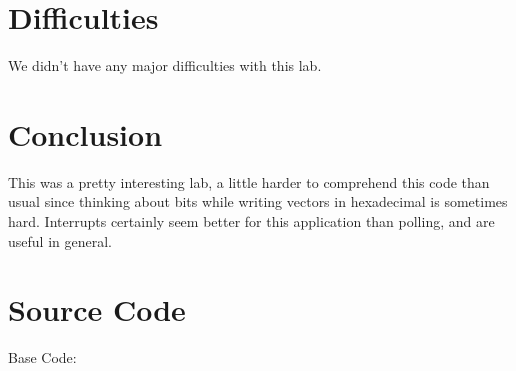 \documentclass[12pt,letterpaper]{article}
\begin{document}
\section{Difficulties}
We didn't have any major difficulties with this lab.

\section{Conclusion}
This was a pretty interesting lab, a little harder to comprehend this code than usual since thinking about bits while writing vectors in hexadecimal is sometimes hard. Interrupts certainly seem better for this application than polling, and are useful in general.

\section{Source Code}
Base Code:
\end{document}
